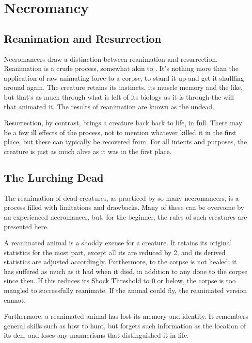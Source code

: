 \chapter{Necromancy}

\section{Reanimation and Resurrection}

Necromancers draw a distinction between reanimation and resurrection.
Reanimation is a crude process, somewhat akin to .
It's nothing more than the application of raw animating force to a corpse, to stand it up and get it shuffling around again.
The creature retains its instincts, its muscle memory and the like, but that's as much through what is left of its biology as it is through the will that animated it.
The results of reanimation are known as the undead.

Resurrection, by contrast, brings a creature back back to life, in full.
There may be a few ill effects of the process, not to mention whatever killed it in the first place, but these can typically be recovered from.
For all intents and purposes, the creature is just as much alive as it was in the first place.

\section{The Lurching Dead}

The reanimation of dead creatures, as practiced by so many necromancers, is a process filled with limitations and drawbacks.
Many of these can be overcome by an experienced necromancer, but, for the beginner, the rules of such creatures are presented here.

A reanimated animal is a shoddy excuse for a creature.
It retains its original statistics for the most part, except all its  are reduced by 2, and its derived statistics are adjusted accordingly.
Furthermore,  to the corpse is not healed; it has suffered as much  as it had when it died, in addition to any  done to the corpse since then.
If this reduces its Shock Threshold to 0 or below, the corpse is too mangled to successfully reanimate.
If the animal could fly, the reanimated version cannot.

Furthermore, a reanimated animal has lost its memory and identity.
It remembers general skills such as how to hunt, but forgets such information as the location of its den, and loses any mannerisms that distinguished it in life.

